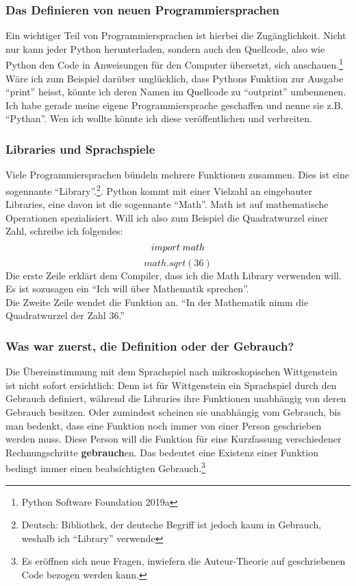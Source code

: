 \documentclass[10pt,a4paper]{article}
\begin{document}
\subsubsection{Das Definieren von neuen Programmiersprachen}
Ein wichtiger Teil von Programmiersprachen ist hierbei die Zugänglichkeit. Nicht nur kann jeder Python herunterladen, sondern auch den Quellcode, also wie Python den Code in Anweisungen für den Computer übersetzt, sich anschauen.\footnote{Python Software Foundation 2019a} Wäre ich zum Beispiel darüber unglücklich, dass Pythons Funktion zur Ausgabe \enquote{print} heisst, könnte ich deren Namen im Quellcode zu \enquote{outprint} umbennenen. Ich habe gerade meine eigene Programmiersprache geschaffen und nenne sie z.B. \enquote{Pythan}. Wen ich wollte könnte ich diese veröffentlichen und verbreiten.

\subsubsection{Libraries und Sprachspiele}
Viele Programmiersprachen bündeln mehrere Funktionen zusammen. Dies ist eine sogennante \enquote{Library}.\footnote{Deutsch: Bibliothek, der deutsche Begriff ist jedoch kaum in Gebrauch, weshalb ich \enquote{Library} verwende}. Python kommt mit einer Vielzahl an eingebauter Libraries, eine davon ist die sogennante \enquote{Math}. Math ist auf mathematische Operationen spezialisiert. Will ich also zum Beispiel die Quadratwurzel einer Zahl, schreibe ich folgendes:
$$import \hspace{1mm} math$$
$$math.sqrt(36)$$
Die erste Zeile erklärt dem Compiler, dass ich die Math Library verwenden will. Es ist sozusagen ein \enquote{Ich will über Mathematik sprechen}. \\
Die Zweite Zeile wendet die Funktion an. \enquote{In der Mathematik nimm die Quadratwurzel der Zahl 36.} \\

\subsubsection{Was war zuerst, die Definition oder der Gebrauch?}
Die Übereinstimmung mit dem Sprachspiel nach mikroskopischen Wittgenstein ist nicht sofort ersichtlich: Denn ist für Wittgenstein ein Sprachspiel durch den Gebrauch definiert, während die Libraries ihre Funktionen unabhängig von deren Gebrauch besitzen. Oder zumindest scheinen sie unabhängig vom Gebrauch, bis man bedenkt, dass eine Funktion noch immer von einer Person geschrieben werden muss. Diese Person will die Funktion für eine Kurzfassung verschiedener Rechnungschritte \textbf{gebrauch}en. Das bedeutet eine Existenz einer Funktion bedingt immer einen beabsichtigten Gebrauch.\footnote{Es eröffnen sich neue Fragen, inwiefern die Auteur-Theorie auf geschriebenen Code bezogen werden kann.}
\end{document}
